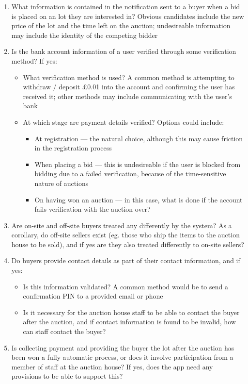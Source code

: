 \documentclass[titlepage, 12pt]{extarticle}
\begin{document}
\begin{enumerate}
\begin{itemize}
  \end{itemize}
\item What information is contained in the notification sent to a buyer when a bid is placed on an lot they are interested in? Obvious candidates include the new price of the lot and the time left on the auction; undesireable information may include the identity of the competing bidder
\item Is the bank account information of a user verified through some verification method? If yes:
  \begin{itemize}
  \item What verification method is used? A common method is attempting to withdraw / deposit \pounds 0.01 into the account and confirming the user has received it; other methods may include communicating with the user's bank
  \item At which stage are payment details verified? Options could include:
    \begin{itemize}
    \item At registration --- the natural choice, although this may cause friction in the registration process
    \item When placing a bid --- this is undesireable if the user is blocked from bidding due to a failed verification, because of the time-sensitive nature of auctions
    \item On having won an auction --- in this case, what is done if the account fails verification with the auction over?
    \end{itemize}
  \end{itemize}
\item Are on-site and off-site buyers treated any differently by the system? As a corollary, do off-site sellers exist (eg. those who ship the items to the auction house to be sold), and if yes are they also treated differently to on-site sellers?
\item Do buyers provide contact details as part of their contact information, and if yes:
  \begin{itemize}
  \item Is this information validated? A common method would be to send a confirmation PIN to a provided email or phone
  \item Is it necessary for the auction house staff to be able to contact the buyer after the auction, and if contact information is found to be invalid, how can staff contact the buyer?
  \end{itemize}
\item Is collecting payment and providing the buyer the lot after the auction has been won a fully automatic process, or does it involve participation from a member of staff at the auction house? If yes, does the app need any provisions to be able to support this?

\end{enumerate}
\end{document}
